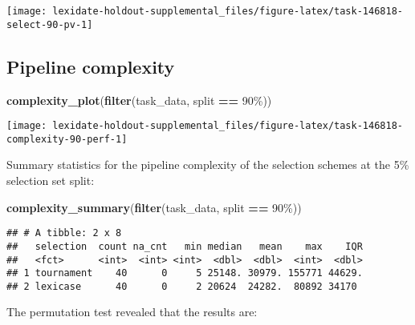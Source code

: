 \documentclass[
]{book}
\newenvironment{Shaded}{\begin{snugshade}}{\end{snugshade}}
\newcommand{\FunctionTok}[1]{\textcolor[rgb]{0.13,0.29,0.53}{\textbf{#1}}}
\newcommand{\NormalTok}[1]{#1}
\newcommand{\SpecialCharTok}[1]{\textcolor[rgb]{0.81,0.36,0.00}{\textbf{#1}}}
\newcommand{\StringTok}[1]{\textcolor[rgb]{0.31,0.60,0.02}{#1}}
\begin{document}
\texttt{[image: lexidate-holdout-supplemental\_files/figure-latex/task-146818-select-90-pv-1]}

\hypertarget{pipeline-complexity-3}{%
\subsection{Pipeline complexity}\label{pipeline-complexity-3}}

\begin{Shaded}
\begin{Highlighting}[]
\FunctionTok{complexity\_plot}\NormalTok{(}\FunctionTok{filter}\NormalTok{(task\_data, split }\SpecialCharTok{==} \StringTok{\textquotesingle{}90\%\textquotesingle{}}\NormalTok{))}
\end{Highlighting}
\end{Shaded}

\texttt{[image: lexidate-holdout-supplemental\_files/figure-latex/task-146818-complexity-90-perf-1]}

Summary statistics for the pipeline complexity of the selection schemes at the 5\% selection set split:

\begin{Shaded}
\begin{Highlighting}[]
\FunctionTok{complexity\_summary}\NormalTok{(}\FunctionTok{filter}\NormalTok{(task\_data, split }\SpecialCharTok{==} \StringTok{\textquotesingle{}90\%\textquotesingle{}}\NormalTok{))}
\end{Highlighting}
\end{Shaded}

\begin{verbatim}
## # A tibble: 2 x 8
##   selection  count na_cnt   min median   mean    max    IQR
##   <fct>      <int>  <int> <int>  <dbl>  <dbl>  <int>  <dbl>
## 1 tournament    40      0     5 25148. 30979. 155771 44629.
## 2 lexicase      40      0     2 20624  24282.  80892 34170
\end{verbatim}

The permutation test revealed that the results are:
\end{document}
